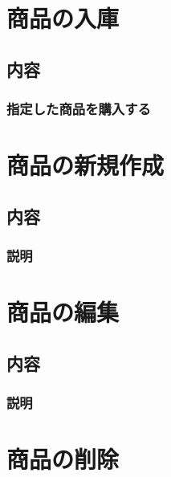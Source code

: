 \documentclass[letterpaper,10pt,dvipdfmx]{sphinxmanual}
\begin{document}
\chapter{商品の入庫}
\label{\detokenize{trader/stock::doc}}\label{\detokenize{trader/stock:id1}}

\section{内容}
\label{\detokenize{trader/stock:id2}}

\subsection{指定した商品を購入する}
\label{\detokenize{trader/stock:id3}}

\chapter{商品の新規作成}
\label{\detokenize{trader/create::doc}}\label{\detokenize{trader/create:id1}}

\section{内容}
\label{\detokenize{trader/create:id2}}

\subsection{説明}
\label{\detokenize{trader/create:id3}}

\chapter{商品の編集}
\label{\detokenize{trader/edit::doc}}\label{\detokenize{trader/edit:id1}}

\section{内容}
\label{\detokenize{trader/edit:id2}}

\subsection{説明}
\label{\detokenize{trader/edit:id3}}

\chapter{商品の削除}
\label{\detokenize{trader/destroy::doc}}\label{\detokenize{trader/destroy:id1}}
\end{document}

